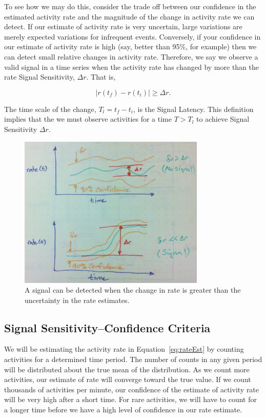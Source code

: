 \documentclass{article}
\begin{document}
To see how we may do this, consider the trade off between our confidence in the estimated activity rate and the magnitude of the change in activity rate we can detect.  If our estimate of activity rate is very uncertain, large variations are merely expected variations for infrequent events.  Conversely, if your confidence in our estimate of activity rate is high (say, better than 95\%, for example) then we can detect small relative changes in activity rate.  Therefore, we say we observe a valid signal in a time series when the activity rate has changed by more than the rate Signal Sensitivity, $\Delta r$.  That is,

\begin{equation}
    \label{eq:signal}
    | r(t_f) - r(t_i) | \geq \Delta r.
\end{equation}

The time scale of the change, $T_l = t_f - t_i$, is the Signal Latency.  This definition implies that the we must observe activities for a time $T > T_l$ to achieve Signal Sensitivity $\Delta r$.

%
\begin{figure}[h]
    \centering
    \includegraphics[width=3.5in]{./imgs/signal.jpg}
        \caption{A signal can be detected when the change in rate is greater than the uncertainty in the rate estimates.}
    \label{fig:signal}
\end{figure}
%
%

\subsection{Signal Sensitivity--Confidence Criteria} 

We will be estimating the activity rate in Equation~\ref{eq:rateEst} by counting activities for a determined time period.  The number of counts in any given period will be distributed about the true mean of the distribution. As we count more activities, our estimate of rate will converge toward the true value.  If we count thousands of activities per minute, our confidence of the estimate of activity rate will be very high after a short time.  For rare activities, we will have to count for a longer time before we have a high level of confidence in our rate estimate.
\end{document}
